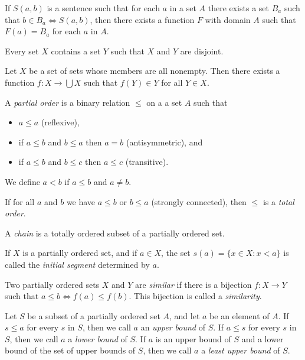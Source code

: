 \begin{axiom}[Substitution]
  If $S(a,b)$ is a sentence such that for each $a$ in a set $A$ there exists a
  set $B_a$ such that $b\in B_a\iff S(a,b)$, then there exists a function $F$ with
  domain $A$ such that $F(a)=B_a$ for each $a$ in $A$.
\end{axiom}
\begin{axiom}[Foundation]
  Every set $X$ contains a set $Y$ such that $X$ and $Y$ are disjoint.
\end{axiom}
\begin{axiom}[Choice]
  Let $X$ be a set of sets whose members are all nonempty. Then there exists a
  function $f:X\to\bigcup X$ such that $f(Y)\in Y$ for all $Y\in X$.
\end{axiom}
\begin{defn}
  A \emph{partial order} is a binary relation $\le$ on a a set $A$ such that
  \begin{itemize}
    \item $a\le a$ (reflexive),
    \item if $a\le b$ and $b\le a$ then $a=b$ (antisymmetric), and
    \item if $a\le b$ and $b\le c$ then $a\le c$ (transitive).
  \end{itemize}
  We define $a<b$ if $a\le b$ and $a\ne b$.

  If for all $a$ and $b$ we have $a\le b$ or $b\le a$ (strongly connected),
  then $\le$ is a \emph{total order}. 

  A \emph{chain} is a totally ordered subset of a partially ordered set.
\end{defn}
\begin{defn}
  If $X$ is a partially ordered set, and if $a\in X$, the set $s(a)=\{x\in
    X:x<a\}$ is called the \emph{initial segment} determined by $a$.
\end{defn}
\begin{defn}
  Two partially ordered sets $X$ and $Y$ are \emph{similar} if there is a
  bijection $f:X\to Y$ such that $a\le b\iff f(a)\le f(b)$. This bijection is
  called a \emph{similarity}.
\end{defn}
\begin{defn}
  Let $S$ be a subset of a partially ordered set $A$, and let $a$ be an element
  of $A$. If $s\le a$ for every $s$ in $S$, then we call $a$ an \emph{upper
    bound} of $S$. If $a\le s$ for every $s$ in $S$, then we call $a$ a
    \emph{lower bound} of $S$. If $a$ is an upper bound of $S$ and a lower
    bound of the set of upper bounds of $S$, then we call $a$ a \emph{least
      upper bound} of $S$.
\end{defn}
